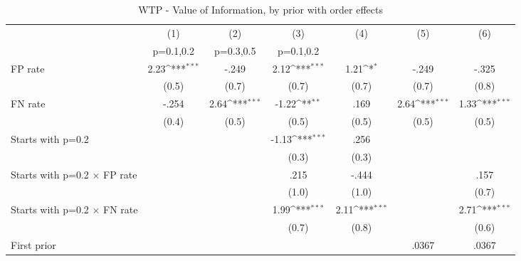 \begin{table}[htbp]\centering
\def\sym#1{\ifmmode^{#1}\else\(^{#1}\)\fi}
\caption{WTP - Value of Information, by prior with order effects}
\begin{tabular}{l*{6}{c}}
\hline\hline
                &\multicolumn{1}{c}{(1)}&\multicolumn{1}{c}{(2)}&\multicolumn{1}{c}{(3)}&\multicolumn{1}{c}{(4)}&\multicolumn{1}{c}{(5)}&\multicolumn{1}{c}{(6)}\\
                &\multicolumn{1}{c}{p=0.1,0.2}&\multicolumn{1}{c}{p=0.3,0.5}&\multicolumn{1}{c}{p=0.1,0.2}&\multicolumn{1}{c}{}&\multicolumn{1}{c}{}&\multicolumn{1}{c}{}\\
\hline
FP rate         &     2.23\sym{***}&    -.249         &     2.12\sym{***}&     1.21\sym{*}  &    -.249         &    -.325         \\
                &    (0.5)         &    (0.7)         &    (0.7)         &    (0.7)         &    (0.7)         &    (0.8)         \\
FN rate         &    -.254         &     2.64\sym{***}&    -1.22\sym{**} &     .169         &     2.64\sym{***}&     1.33\sym{***}\\
                &    (0.4)         &    (0.5)         &    (0.5)         &    (0.5)         &    (0.5)         &    (0.5)         \\
Starts with p=0.2&                  &                  &    -1.13\sym{***}&     .256         &                  &                  \\
                &                  &                  &    (0.3)         &    (0.3)         &                  &                  \\
Starts with p=0.2 $\times$ FP rate&                  &                  &     .215         &    -.444         &                  &     .157         \\
                &                  &                  &    (1.0)         &    (1.0)         &                  &    (0.7)         \\
Starts with p=0.2 $\times$ FN rate&                  &                  &     1.99\sym{***}&     2.11\sym{***}&                  &     2.71\sym{***}\\
                &                  &                  &    (0.7)         &    (0.8)         &                  &    (0.6)         \\
First prior     &                  &                  &                  &                  &    .0367         &    .0367         \\

\end{tabular}
\end{table}
